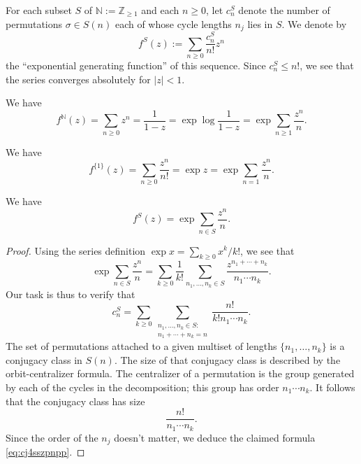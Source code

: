 \documentclass[reqno]{amsart} 
\begin{document}
For each subset $S$ of $\mathbb{N} := \mathbb{Z}_{\geq 1}$ and each $n \geq 0$, let $c_n^S$ denote the number of permutations $\sigma \in S(n)$ each of whose cycle lengths $n_j$ lies in $S$.  We denote by
\begin{equation*}
  f^S(z) := \sum_{n \geq 0} \frac{c_n^S}{n!} z^n
\end{equation*}
the ``exponential generating function'' of this sequence.  Since $c_n^S \leq n!$, we see that the series converges absolutely for $|z| < 1$.
\begin{example}
  We have
  \begin{equation*}
    f^{\mathbb{N} } (z) = \sum_{n \geq 0} z^n = \frac{1}{1-z}
    = \exp \log \frac{1}{1 - z}
    =
    \exp \sum _{n \geq 1} \frac{z^n}{n}.
  \end{equation*}
\end{example}
\begin{example}
  We have
  \begin{equation*}
    f^{\{1\}}(z) = \sum_{n \geq 0} \frac{z^n}{n!} = \exp z
    = \exp \sum_{n = 1} \frac{z^n }{n}.
  \end{equation*}
\end{example}
\begin{lemma}
  We have
  \begin{equation*}
    f^S(z) = \exp \sum_{n \in S} \frac{z^n}{n}.
  \end{equation*}
\end{lemma}
\begin{proof}
  Using the series definition $\exp x = \sum_{k \geq 0} x^k / k!$, we see that
  \begin{equation*}
    \exp \sum_{n \in S} \frac{z^n}{n}
    = \sum_{k \geq 0}
    \frac{1}{k!}
    \sum_{n_1, \dotsc, n_k \in S}
    \frac{z^{n _1 + \dotsb + n_k}}{n_1 \dotsb n_k}.
  \end{equation*}
  Our task is thus to verify that
  \begin{equation}\label{eq:cj4sszpnpp}
    c_n^S = \sum_{k \geq 0}
    \sum_{
      \substack{
        n_1, \dotsc, n_k \in S : \\
        n_1 + \dotsb + n_k = n
      }
    }
    \frac{n!}{k ! n_1 \dotsb n_k}.
  \end{equation}
  The set of permutations attached to a given multiset of lengths $\{n_1, \dotsc, n_k\}$ is a conjugacy class in $S(n)$.  The size of that conjugacy class is described by the orbit-centralizer formula.  The centralizer of a permutation is the group generated by each of the cycles in the decomposition; this group has order $n_1 \dotsb n_k$.  It follows that the conjugacy class has size
  \begin{equation*}
    \frac{n!}{n_1 \dotsb n_k}.
  \end{equation*}
  Since the order of the $n_j$ doesn't matter, we deduce the claimed formula \eqref{eq:cj4sszpnpp}.
\end{proof}
\end{document}
